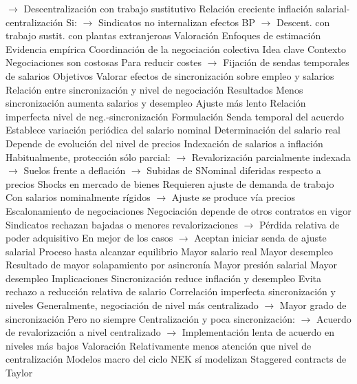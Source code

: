 \documentclass{nuevotema}
\begin{document}
\begin{esquemal}
				\4[] $\to$ Descentralización con trabajo sustitutivo
				\4 Relación creciente inflación salarial-centralización
				\4[] Si:
				\4[] $\to$ Sindicatos no internalizan efectos BP
				\4[] $\to$ Descent. con trabajo sustit. con plantas extranjeroas
			\3 Valoración
				\4 Enfoques de estimación
				\4 Evidencia empírica
		\2 Coordinación de la negociación colectiva
			\3 Idea clave
				\4 Contexto
				\4[] Negociaciones son costosas
				\4[] Para reducir costes
				\4[] $\to$ Fijación de sendas temporales de salarios
				\4 Objetivos
				\4[] Valorar efectos de sincronización sobre empleo y salarios
				\4[] Relación entre sincronización y nivel de negociación
				\4 Resultados
				\4[] Menos sincronización aumenta salarios y desempleo
				\4[] Ajuste más lento
				\4[] Relación imperfecta nivel de neg.-sincronización
			\3 Formulación
				\4 Senda temporal del acuerdo
				\4[] Establece variación periódica del salario nominal
				\4 Determinación del salario real
				\4[] Depende de evolución del nivel de precios
				\4 Indexación de salarios a inflación
				\4[] Habitualmente, protección sólo parcial:
				\4[] $\to$ Revalorización parcialmente indexada
				\4[] $\to$ Suelos frente a deflación
				\4[] $\to$ Subidas de SNominal diferidas respecto a precios
				\4 Shocks en mercado de bienes
				\4[] Requieren ajuste de demanda de trabajo
				\4[] Con salarios nominalmente rígidos
				\4[] $\to$ Ajuste se produce vía precios
				\4 Escalonamiento de negociaciones
				\4[] Negociación depende de otros contratos en vigor
				\4[] Sindicatos rechazan bajadas o menores revalorizaciones
				\4[] $\to$ Pérdida relativa de poder adquisitivo
				\4[] En mejor de los casos
				\4[] $\to$ Aceptan iniciar senda de ajuste salarial
				\4 Proceso hasta alcanzar equilibrio
				\4[] Mayor salario real
				\4[] Mayor desempleo
				\4 Resultado de mayor solapamiento por asincronía
				\4[] Mayor presión salarial
				\4[] Mayor desempleo
			\3 Implicaciones
				\4 Sincronización reduce inflación y desempleo
				\4[] Evita rechazo a reducción relativa de salario
				\4 Correlación imperfecta sincronización y niveles
				\4[] Generalmente, negociación de nivel más centralizado
				\4[] $\to$ Mayor grado de sincronización
				\4[] Pero no siempre
				\4[] Centralización y poca sincronización:
				\4[] $\to$ Acuerdo de revalorización a nivel centralizado
				\4[] $\to$ Implementación lenta de acuerdo en niveles más bajos
			\3 Valoración
				\4 Relativamente menos atención que nivel de centralización
				\4 Modelos macro del ciclo NEK sí modelizan
				\4[] Staggered contracts de Taylor

\end{esquemal}
\end{document}
